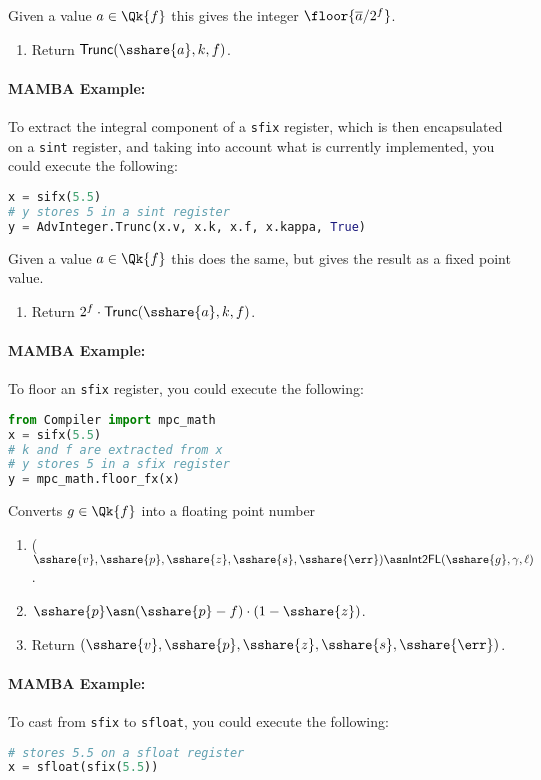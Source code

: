   Given a value $a \in \Qk{f}$ this gives the integer
$\floor{\overline{a}/2^f}$.
  \begin{enumerate}
    \item Return $\mathsf{Trunc}(\sshare{a},k,f)$.
  \end{enumerate}

  \paragraph{MAMBA Example:} To extract the integral component of a \verb|sfix| register, which is then encapsulated on a \verb|sint| register,
  and taking into account what is currently implemented, you could execute the following:
  \begin{lstlisting}[language={python}]
x = sifx(5.5)
# y stores 5 in a sint register
y = AdvInteger.Trunc(x.v, x.k, x.f, x.kappa, True)
\end{lstlisting}
  Given a value $a \in \Qk{f}$ this does the same, but
  gives the result as a fixed point value.
  \begin{enumerate}
    \item Return $2^f \cdot \mathsf{Trunc}(\sshare{a},k,f)$.
  \end{enumerate}
  \paragraph{MAMBA Example:} To floor an \verb|sfix| register, you could execute the following:
  \begin{lstlisting}[language={python}]
from Compiler import mpc_math
x = sifx(5.5)
# k and f are extracted from x
# y stores 5 in a sfix register
y = mpc_math.floor_fx(x)
\end{lstlisting}

  Converts $g \in \Qk{f}$ into a floating point number
  \begin{enumerate}
    \item ($\sshare{v},\sshare{p},\sshare{z},\sshare{s},\sshare{\err})
            \asn \mathsf{Int2FL}(\sshare{g},\gamma,\ell)$.
    \item $\sshare{p} \asn (\sshare{p}-f) \cdot (1-\sshare{z})$.
    \item Return $(\sshare{v},\sshare{p},\sshare{z},\sshare{s},\sshare{\err})$.
  \end{enumerate}
  \paragraph{MAMBA Example:} To cast from \verb|sfix| to \verb|sfloat|, you could execute the following:
  \begin{lstlisting}[language={python}]
# stores 5.5 on a sfloat register
x = sfloat(sfix(5.5))
\end{lstlisting}

